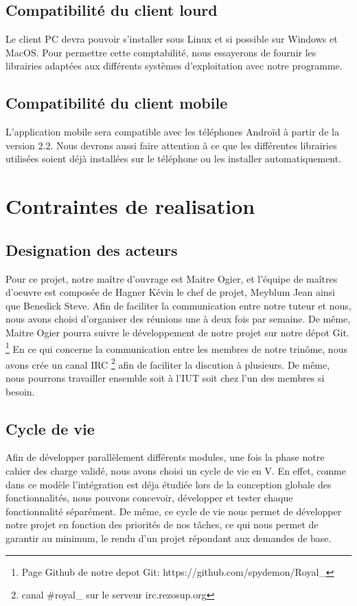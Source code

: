 \subsection{Compatibilité du client lourd}
Le client PC devra pouvoir s'installer sous Linux et si possible sur Windows et MacOS. 
Pour permettre cette comptabilité, nous essayerons de fournir les librairies adaptées aux différents systèmes d'exploitation avec notre programme. 

\subsection{Compatibilité du client mobile}
L'application mobile sera compatible avec les téléphones Androïd à partir de la version 2.2. 
Nous devrons aussi faire attention à ce que les différentes librairies utilisées soient déjà installées sur le téléphone ou les installer automatiquement.

\section{Contraintes de realisation}

\subsection{Designation des acteurs}
Pour ce projet, notre maître d'ouvrage est Maitre Ogier, et l'équipe de maîtres d'oeuvre est composée de Hagner Kévin le chef de projet, Meyblum Jean ainsi que Benedick Steve.
Afin de faciliter la communication entre notre tuteur et nous, nous avons choisi d'organiser des réunions une à deux fois par semaine. De même, Maitre Ogier pourra suivre le développement de notre projet sur notre dépot Git.
\footnote{Page Github de notre depot Git: https://github.com/spydemon/Royal\_} 
En ce qui concerne la communication entre les membres de notre trinôme, nous avons crée un canal IRC \footnote{ canal \#royal\_ sur le serveur irc.rezosup.org} afin de faciliter la discution à plusieurs. 
De même, nous pourrons travailler ensemble soit à l'IUT soit chez l'un des membres si besoin.

\subsection{Cycle de vie}
Afin de développer parallèlement différents modules, une fois la phase notre cahier des charge validé, nous avons choisi un cycle de vie en V. 
En effet, comme dans ce modèle l'intégration est déja étudiée lors de la conception globale des fonctionnalités, nous pouvons concevoir, développer et tester chaque fonctionnalité séparément. 
De même, ce cycle de vie nous permet de développer notre projet en fonction des priorités de nos tâches, ce qui nous permet de garantir au minimum, le rendu d'un projet répondant aux demandes de base.
